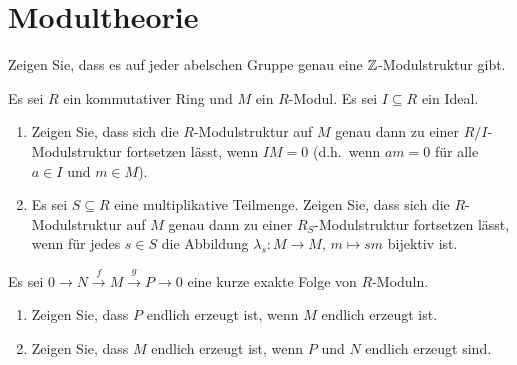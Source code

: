 \section{Modultheorie}


\begin{question}
  Zeigen Sie, dass es auf jeder abelschen Gruppe genau eine $\mathbb{Z}$-Modulstruktur gibt.
\end{question}




\begin{question}
  Es sei $R$ ein kommutativer Ring und $M$ ein $R$-Modul.
  Es sei $I \subseteq R$ ein Ideal.
  \begin{enumerate}
    \item
      Zeigen Sie, dass sich die $R$-Modulstruktur auf $M$ genau dann zu einer $R/I$-Modulstruktur fortsetzen lässt, wenn $IM =  0$ (d.h.\ wenn $am = 0$ für alle $a \in I$ und $m \in M$).
    \item
      Es sei $S \subseteq R$ eine multiplikative Teilmenge.
      Zeigen Sie, dass sich die $R$-Modulstruktur auf $M$ genau dann zu einer $R_S$-Modulstruktur fortsetzen lässt, wenn für jedes $s \in S$ die Abbildung $\lambda_s \colon M \to M$, $m \mapsto sm$ bijektiv ist.
  \end{enumerate}
\end{question}




\begin{question}
  Es sei $0 \to N \xrightarrow{f} M \xrightarrow{g} P \to 0$ eine kurze exakte Folge von $R$-Moduln.
  \begin{enumerate}
    \item
      Zeigen Sie, dass $P$ endlich erzeugt ist, wenn $M$ endlich erzeugt ist.
    \item
      Zeigen Sie, dass $M$ endlich erzeugt ist, wenn $P$ und $N$ endlich erzeugt sind.
  \end{enumerate}
\end{question}



